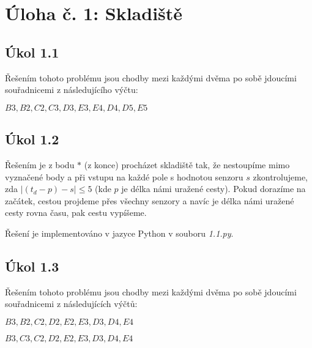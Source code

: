 \documentclass[a4paper, 12pt]{article}
\begin{document}
  \section*{Úloha č. 1: Skladiště}

  \subsection*{Úkol 1.1}
  Řešením tohoto problému jsou chodby mezi každými dvěma po sobě jdoucími souřadnicemi z následujícího výčtu:

  \begin{center}
    $B3, B2, C2, C3, D3, E3, E4, D4, D5, E5$
  \end{center}

  \subsection*{Úkol 1.2}
  Řešením je z bodu $*$ (z konce) procházet skladiště tak, že nestoupíme mimo vyznačené body a při vstupu na každé pole s hodnotou senzoru $s$ zkontrolujeme, zda $|(t_d - p) - s| \le 5$ (kde $p$ je délka námi uražené cesty). Pokud dorazíme na začátek, cestou projdeme přes všechny senzory a navíc je délka námi uražené cesty rovna času, pak cestu vypíšeme.

  Řešení je implementováno v jazyce Python v souboru \textit{1.1.py}.

  \subsection*{Úkol 1.3}
  Řešením tohoto problému jsou chodby mezi každými dvěma po sobě jdoucími souřadnicemi z následujících výčtů:

  \begin{center}
    $B3, B2, C2, D2, E2, E3, D3, D4, E4$

    $B3, C3, C2, D2, E2, E3, D3, D4, E4$
  \end{center}
\end{document}
